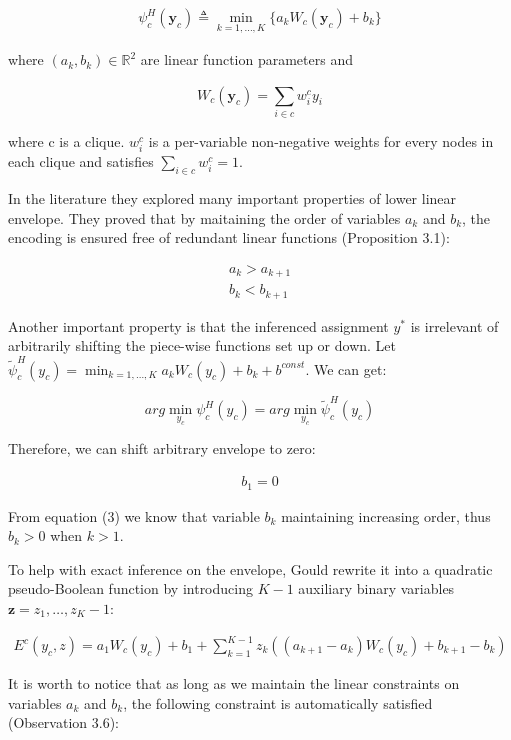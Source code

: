 \documentclass[twoside,doublespace,onecolumn,11pt,a4paper]{book}
\renewcommand{\cite}{\citep}
\begin{document}
\begin{align}
  \psi_c^H(\mathbf{y}_c) \triangleq
  \min_{k=1,\dots,K}\bigg\{a_kW_c(\mathbf{y}_c)+b_k\bigg\}
\end{align}

where $(a_k,b_k)\in\mathbb{R}^2$ are linear function parameters
and

$$
W_c(\mathbf{y}_c) = \sum_{i\in c}^{}w_i^cy_i
$$

where c is a clique. $w_i^c$ is a per-variable non-negative
weights for every nodes in each clique and satisfies $\sum_ {i\in
  c}^{}w_i^c=1$.

In the literature they explored many important properties of
lower linear envelope. They proved that by maitaining the order
of variables $a_k$ and $b_k$, the encoding is ensured free of
redundant linear functions (Proposition 3.1\cite{gouldlearning}):

\begin{align}
  a_k > a_{k+1}\\
  b_k < b_{k+1}
\end{align}

Another important property is that the inferenced assignment
$y^*$ is irrelevant of arbitrarily shifting the piece-wise
functions set up or down. Let $ \tilde{\psi}_c^H(y_c) =
\min_{k=1,\dots,K}{a_kW_c(y_c)+b_k+b^{const}}$. We can get:

$$
arg\min_{y_c}{\psi_c^H(y_c)}=arg\min_{y_c}{\tilde{\psi}_c^H(y_c)}
$$

Therefore, we can shift arbitrary envelope to zero:

\begin{align}
  b_1 = 0
\end{align}

From equation (3) we know that variable $b_k$ maintaining
increasing order, thus $b_k>0$ when $k>1$.

To help with exact inference on the envelope,
Gould\cite{gouldlearning} rewrite it into a quadratic
pseudo-Boolean function by introducing $K-1$ auxiliary binary
variables $\mathbf{z} = {z_1,\dots,z_K-1}$:

\begin{align}
  E^c(y_c,z)=a_1W_c(y_c)+b_1+\sum_{k=1}^{K-1}z_k((a_{k+1}-a_k)W_c(y_c)+b_{k+1}-b_k)
\end{align}

It is worth to notice that as long as we maintain the linear
constraints on variables $a_k$ and $b_k$, the following
constraint is automatically satisfied (Observation
3.6\cite{gouldlearning}):
\end{document}
